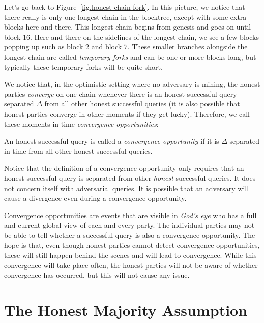 Let's go back to Figure~\ref{fig.honest-chain-fork}. In this picture, we notice that there
really is only one longest chain in the blocktree, except with some extra blocks here and
there. This longest chain begins from genesis and goes on until block $16$. Here and there
on the sidelines of the longest chain, we see a few blocks popping up such as block $2$
and block $7$. These smaller branches alongside the longest chain are called \emph{temporary
forks} and can be one or more blocks long, but typically these
temporary forks will be quite short.

We notice that, in the optimistic setting where no adversary is mining, the honest parties
\emph{converge} on one chain whenever there is an honest successful query separated $\Delta$
from all other honest successful queries (it is also possible that honest parties converge
in other moments if they get lucky). Therefore, we call these moments in time \emph{convergence
opportunities}:

\begin{definition}
    An honest successful query is called a \emph{convergence opportunity} if it is $\Delta$
    separated in time from all other honest successful queries.
\end{definition}

Notice that the definition of a convergence opportunity only requires that an honest successful
query is separated from other \emph{honest} successful queries. It does not concern itself with
adversarial queries. It is possible that an adversary will cause a divergence even during a
convergence opportunity.

Convergence opportunities are events that are visible in \emph{God's eye} who has a full
and current global view of each and every party. The individual parties may not be able to tell
whether a successful query is also a convergence opportunity. The hope is that, even though honest
parties cannot detect convergence opportunities, these will still happen behind the scenes
and will lead to convergence. While this convergence will take place often, the honest
parties will not be aware of whether convergence has occurred, but this will not cause
any issue.

\section{The Honest Majority Assumption}

